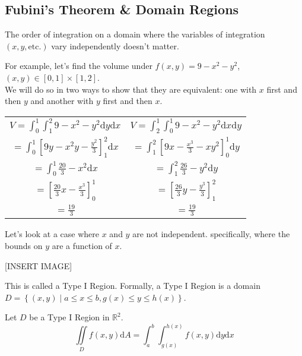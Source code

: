 \subsection{Fubini's Theorem \& Domain Regions}
\begin{theorem}
	The order of integration on a domain where the variables of integration $\left(x, y, \text{etc.}\right)$ vary independently doesn't matter.
\end{theorem}

\noindent
For example, let's find the volume under $f(x,y) = 9-x^2-y^2$, $(x,y) \in [0,1] \times [1,2]$.\\
We will do so in two ways to show that they are equivalent: one with $x$ first and then $y$ and another with $y$ first and then $x$.\\
\begin{center}
	\begin{tabular}{c|c}
		$V = \int_{0}^{1}{\int_{1}^{2}{9 - x^2 - y^2\mathrm{d}y}\mathrm{d}x}$ & $V =\int_{2}^{1}{\int_{0}^{1}{9 - x^2 - y^2\mathrm{d}x}\mathrm{d}y}$ \\
		$= \int_{0}^{1}{\left[9y - x^2y - \frac{y^2}{3}\right]_{1}^{2}\mathrm{d}x}$ & $= \int_{1}^{2}{\left[9x - \frac{x^3}{3} - xy^2\right]_{0}^{1}\mathrm{d}y}$ \\
		$= \int_{0}^{1}{\frac{20}{3} - x^2\mathrm{d}x}$ & $= \int_{1}^{2}{\frac{26}{3} - y^2\mathrm{d}y}$ \\
		$= \left[\frac{20}{3}x - \frac{x^3}{3}\right]_{0}^{1}$ & $= \left[\frac{26}{3}y - \frac{y^3}{3}\right]_{1}^{2}$ \\
		$= \frac{19}{3}$ & $= \frac{19}{3}$ \\
	\end{tabular}
\end{center}

\noindent
Let's look at a case where $x$ and $y$ are not independent. specifically, where the bounds on $y$ are a function of $x$.

[INSERT IMAGE]

\noindent
This is called a Type I Region. Formally, a Type I Region is a domain $D = \left\{ (x,y) \mid a \leq x \leq b, g(x) \leq y \leq h(x) \right\}$.\\

\begin{theorem}
	Let $D$ be a Type I Region in $\mathbb{R}^2$.\\
	\begin{equation*}
		\iint\limits_{D}{f(x,y)\mathrm{d}A} = \int_{a}^{b}{\int_{g(x)}^{h(x)}{f(x,y)\mathrm{d}y}\mathrm{d}x}
	\end{equation*}
\end{theorem}

